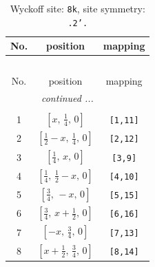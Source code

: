 \documentclass[fleqn,8pt]{jsarticle}
\begin{document}
\begin{longtable}{ccc}
\caption{Wyckoff site: {\tt 8k}, site symmetry: {\tt .2'.}}
 \\
 \hline \hline
No. & position & mapping \\ \hline \endfirsthead

\multicolumn{2}{l}{\tablename\ \thetable{}} \\
 \hline \hline
No. & position & mapping \\ \hline \endhead

 \hline \hline
\multicolumn{2}{r}{\footnotesize\it continued ...} \\ \endfoot

 \hline \hline
\multicolumn{2}{r}{} \\ \endlastfoot

1 & $\left[ x,\, \frac{1}{4},\, 0 \right]$ & {\tt [1,11]} \\ \hline
2 & $\left[ \frac{1}{2} - x,\, \frac{1}{4},\, 0 \right]$ & {\tt [2,12]} \\ \hline
3 & $\left[ \frac{1}{4},\, x,\, 0 \right]$ & {\tt [3,9]} \\ \hline
4 & $\left[ \frac{1}{4},\, \frac{1}{2} - x,\, 0 \right]$ & {\tt [4,10]} \\ \hline
5 & $\left[ \frac{3}{4},\, - x,\, 0 \right]$ & {\tt [5,15]} \\ \hline
6 & $\left[ \frac{3}{4},\, x + \frac{1}{2},\, 0 \right]$ & {\tt [6,16]} \\ \hline
7 & $\left[ - x,\, \frac{3}{4},\, 0 \right]$ & {\tt [7,13]} \\ \hline
8 & $\left[ x + \frac{1}{2},\, \frac{3}{4},\, 0 \right]$ & {\tt [8,14]} \\
\end{longtable}
\renewcommand{\arraystretch}{1.2}
\end{document}
